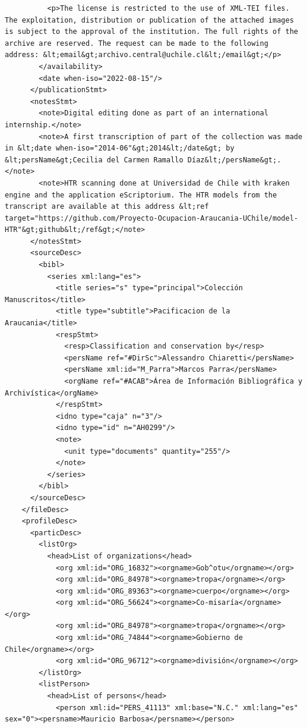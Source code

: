 \begin{verbatim}
          <p>The license is restricted to the use of XML-TEI files. The exploitation, distribution or publication of the attached images is subject to the approval of the institution. The full rights of the archive are reserved. The request can be made to the following address: &lt;email&gt;archivo.central@uchile.cl&lt;/email&gt;</p>
        </availability>
        <date when-iso="2022-08-15"/>
      </publicationStmt>
      <notesStmt>
        <note>Digital editing done as part of an international internship.</note>
        <note>A first transcription of part of the collection was made in &lt;date when-iso="2014-06"&gt;2014&lt;/date&gt; by &lt;persName&gt;Cecilia del Carmen Ramallo Díaz&lt;/persName&gt;.</note>
        <note>HTR scanning done at Universidad de Chile with kraken engine and the application eScriptorium. The HTR models from the transcript are available at this address &lt;ref target="https://github.com/Proyecto-Ocupacion-Araucania-UChile/model-HTR"&gt;github&lt;/ref&gt;</note>
      </notesStmt>
      <sourceDesc>
        <bibl>
          <series xml:lang="es">
            <title series="s" type="principal">Colección Manuscritos</title>
            <title type="subtitle">Pacificacion de la Araucania</title>
            <respStmt>
              <resp>Classification and conservation by</resp>
              <persName ref="#DirSc">Alessandro Chiaretti</persName>
              <persName xml:id="M_Parra">Marcos Parra</persName>
              <orgName ref="#ACAB">Área de Información Bibliográfica y Archivística</orgName>
            </respStmt>
            <idno type="caja" n="3"/>
            <idno type="id" n="AH0299"/>
            <note>
              <unit type="documents" quantity="255"/>
            </note>
          </series>
        </bibl>
      </sourceDesc>
    </fileDesc>
    <profileDesc>
      <particDesc>
        <listOrg>
          <head>List of organizations</head>
            <org xml:id="ORG_16832"><orgname>Gob^otu</orgname></org>
            <org xml:id="ORG_84978"><orgname>tropa</orgname></org>
            <org xml:id="ORG_89363"><orgname>cuerpo</orgname></org>
            <org xml:id="ORG_56624"><orgname>Co-misaría</orgname></org>
            <org xml:id="ORG_84978"><orgname>tropa</orgname></org>
            <org xml:id="ORG_74844"><orgname>Gobierno de Chile</orgname></org>
            <org xml:id="ORG_96712"><orgname>división</orgname></org>
        </listOrg>
        <listPerson>
          <head>List of persons</head>
            <person xml:id="PERS_41113" xml:base="N.C." xml:lang="es" sex="0"><persname>Mauricio Barbosa</persname></person>

\end{verbatim}
